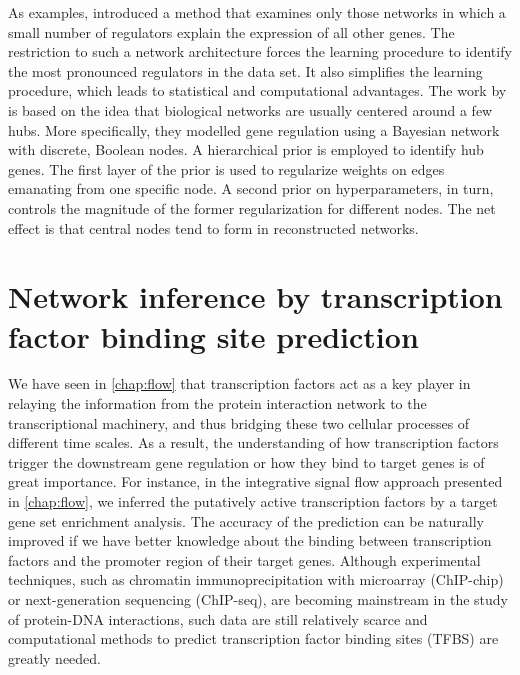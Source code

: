 As examples, \cite{Pe'er2002} introduced a method that examines only
those networks in which a small number of
regulators explain the expression of all other
genes. The restriction to such a
network architecture forces the learning procedure to identify the most pronounced regulators in the data set. It also simplifies the
learning procedure, which leads to statistical
and computational advantages. The work by \cite{Boeck2012} is based on the idea 
that biological 
networks are usually centered around a few hubs. More specifically, they modelled gene regulation using a Bayesian network with discrete, Boolean nodes. A hierarchical prior is employed to identify hub genes. The first layer of the prior is used to regularize weights on edges emanating from one specific node. A second prior on hyperparameters, in turn, controls the magnitude of the former regularization for different nodes. The net effect is that central nodes tend to form in reconstructed networks.

\section{Network inference by transcription factor binding site prediction}
We have seen in \ref{chap:flow} that transcription factors act as a key player
in relaying the information from the protein interaction network to the
transcriptional machinery, and thus bridging these two cellular processes
of different time scales. As a result, the understanding of how transcription
factors trigger the downstream gene regulation or how they bind to target genes
is of great importance. For instance, in the integrative signal flow approach
presented in \ref{chap:flow}, we inferred the putatively active transcription
factors by a target gene set enrichment analysis. The accuracy of the prediction
can be naturally improved if we have better knowledge about
the binding between transcription factors and the 
promoter region of their target genes. 
Although experimental techniques,
such as chromatin immunoprecipitation with microarray (ChIP-chip) or 
next-generation sequencing (ChIP-seq), are becoming mainstream in the study
of protein-DNA interactions, such data are still relatively scarce and 
computational methods to predict transcription factor binding sites (TFBS) are
greatly needed. 

